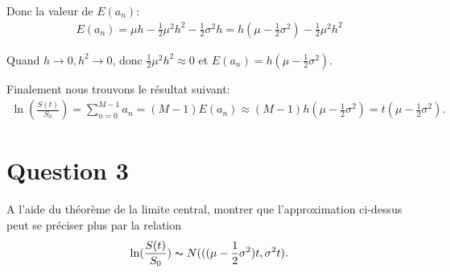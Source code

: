 \documentclass[a4paper,10pt]{report}
\begin{document}
\par \noindent Donc la valeur de $E(a_{n})$:
\begin{align*}
	E(a_{n}) = \mu h -\frac{1}{2} \mu^{2} h^{2} -\frac{1}{2} \sigma^{2} h = h(\mu - \frac{1}{2} \sigma^{2}) -\frac{1}{2} \mu^{2} h^{2}
\end{align*}
\par \noindent Quand $h \rightarrow 0, h^{2} \rightarrow 0$, donc $\frac{1}{2} \mu^{2} h^{2} \approx 0$ et $E(a_{n}) = h(\mu - \frac{1}{2} \sigma^{2})$.
\par \noindent Finalement nous trouvons le résultat suivant:
\begin{align*}
		\ln (\frac{S(t)}{S_{0}}) = \sum_{n=0}^{M-1} a_{n} = (M-1) E(a_{n}) \approx (M - 1) h(\mu - \frac{1}{2} \sigma^{2}) = t(\mu - \frac{1}{2} \sigma^{2}).
\end{align*}

\section{Question 3}
\par \noindent A l'aide du théorème de la limite central, montrer que l'approximation ci-dessus peut se préciser plus par la relation
\begin{align*}
	\ln (\frac{S(t)}{S_{0}}) \thicksim N(((\mu - \frac{1}{2} \sigma^{2})t, \sigma^{2}t).
\end{align*}
\end{document}

